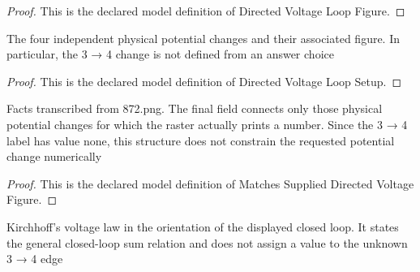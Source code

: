 \begin{proof}
  This is the declared model definition of Directed Voltage Loop Figure.
\end{proof}
\begin{definition}
  \label{def:physics:phyx-mini-0872:phyxminiproblems-problemphyxmini0872-directedvoltageloopsetup}
  The four independent physical potential changes and their associated figure. In particular, the 3 → 4 change is not defined from an answer choice
\end{definition}
\begin{proof}
  This is the declared model definition of Directed Voltage Loop Setup.
\end{proof}
\begin{definition}
  \label{def:physics:phyx-mini-0872:phyxminiproblems-problemphyxmini0872-matchessupplieddirectedvoltagefigure}
  Facts transcribed from 872.png. The final field connects only those physical potential changes for which the raster actually prints a number. Since the 3 → 4 label has value none, this structure does not constrain the requested potential change numerically
\end{definition}
\begin{proof}
  This is the declared model definition of Matches Supplied Directed Voltage Figure.
\end{proof}
\begin{definition}
  \label{def:physics:phyx-mini-0872:phyxminiproblems-problemphyxmini0872-satisfiesclosedloopvoltagelaw}
  Kirchhoff's voltage law in the orientation of the displayed closed loop. It states the general closed-loop sum relation and does not assign a value to the unknown 3 → 4 edge
\end{definition}
